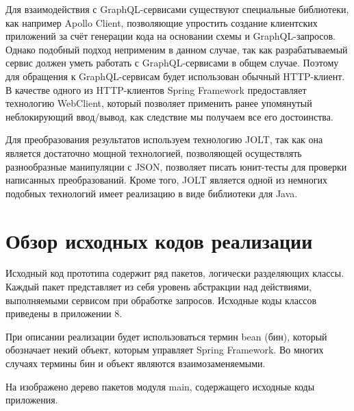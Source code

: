 Для взаимодействия с GraphQL-сервисами существуют специальные библиотеки, как например Apollo Client, позволяющие упростить создание клиентских приложений за счёт генерации кода на основании схемы и GraphQL-запросов.
Однако подобный подход неприменим в данном случае, так как разрабатываемый сервис должен уметь работать с GraphQL-сервисами в общем случае.
Поэтому для обращения к GraphQL-сервисам будет использован обычный HTTP-клиент.
В качестве одного из HTTP-клиентов Spring Framework предоставляет технологию WebClient, который позволяет применить ранее упомянутый неблокирующий ввод/вывод, как следствие мы получаем все его достоинства.

Для преобразования результатов используем технологию JOLT, так как она является достаточно мощной технологией, позволяющей осуществлять разнообразные манипуляции с JSON, позволяет писать юнит-тесты для проверки написанных преобразований.
Кроме того, JOLT является одной из немногих подобных технологий имеет реализацию в виде библиотеки для Java.


\section{Обзор исходных кодов реализации}\label{sec:sources-review}

Исходный код прототипа содержит ряд пакетов, логически разделяющих классы.
Каждый пакет представляет из себя уровень абстракции над действиями, выполняемыми сервисом при обработке запросов.
Исходные коды классов приведены в приложении 8.

При описании реализации будет использоваться термин bean (бин), который обозначает некий объект, которым управляет Spring Framework.
Во многих случаях термины бин и объект являются взаимозаменяемыми.

На  изображено дерево пакетов модуля main, содержащего исходные коды приложения.

